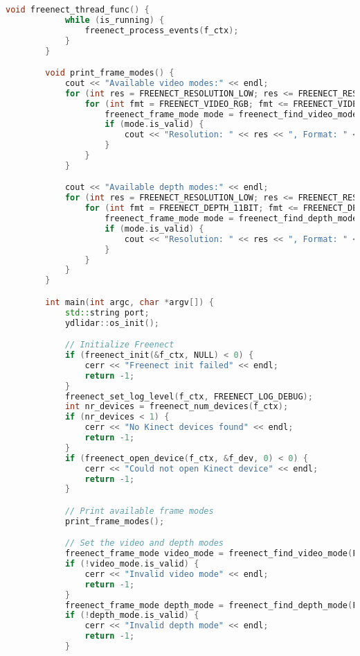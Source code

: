 \begin{lstlisting}[language={C++}, caption={C\'odigo de ejemplo de Kinect y LiDAR}, label={Script}]
        void freenect_thread_func() {
            while (is_running) {
                freenect_process_events(f_ctx);
            }
        }

        void print_frame_modes() {
            cout << "Available video modes:" << endl;
            for (int res = FREENECT_RESOLUTION_LOW; res <= FREENECT_RESOLUTION_HIGH; ++res) {
                for (int fmt = FREENECT_VIDEO_RGB; fmt <= FREENECT_VIDEO_IR_8BIT; ++fmt) {
                    freenect_frame_mode mode = freenect_find_video_mode((freenect_resolution)res, (freenect_video_format)fmt);
                    if (mode.is_valid) {
                        cout << "Resolution: " << res << ", Format: " << fmt << ", Width: " << mode.width << ", Height: " << mode.height << ", Bytes per pixel: " << mode.data_bits_per_pixel << endl;
                    }
                }
            }

            cout << "Available depth modes:" << endl;
            for (int res = FREENECT_RESOLUTION_LOW; res <= FREENECT_RESOLUTION_HIGH; ++res) {
                for (int fmt = FREENECT_DEPTH_11BIT; fmt <= FREENECT_DEPTH_REGISTERED; ++fmt) {
                    freenect_frame_mode mode = freenect_find_depth_mode((freenect_resolution)res, (freenect_depth_format)fmt);
                    if (mode.is_valid) {
                        cout << "Resolution: " << res << ", Format: " << fmt << ", Width: " << mode.width << ", Height: " << mode.height << ", Bytes per pixel: " << mode.data_bits_per_pixel << endl;
                    }
                }
            }
        }

        int main(int argc, char *argv[]) {
            std::string port;
            ydlidar::os_init();

            // Initialize Freenect
            if (freenect_init(&f_ctx, NULL) < 0) {
                cerr << "Freenect init failed" << endl;
                return -1;
            }
            freenect_set_log_level(f_ctx, FREENECT_LOG_DEBUG);
            int nr_devices = freenect_num_devices(f_ctx);
            if (nr_devices < 1) {
                cerr << "No Kinect devices found" << endl;
                return -1;
            }
            if (freenect_open_device(f_ctx, &f_dev, 0) < 0) {
                cerr << "Could not open Kinect device" << endl;
                return -1;
            }

            // Print available frame modes
            print_frame_modes();

            // Set the video and depth modes
            freenect_frame_mode video_mode = freenect_find_video_mode(FREENECT_RESOLUTION_MEDIUM, FREENECT_VIDEO_RGB);
            if (!video_mode.is_valid) {
                cerr << "Invalid video mode" << endl;
                return -1;
            }
            freenect_frame_mode depth_mode = freenect_find_depth_mode(FREENECT_RESOLUTION_MEDIUM, FREENECT_DEPTH_11BIT);
            if (!depth_mode.is_valid) {
                cerr << "Invalid depth mode" << endl;
                return -1;
            }


\end{lstlisting}
